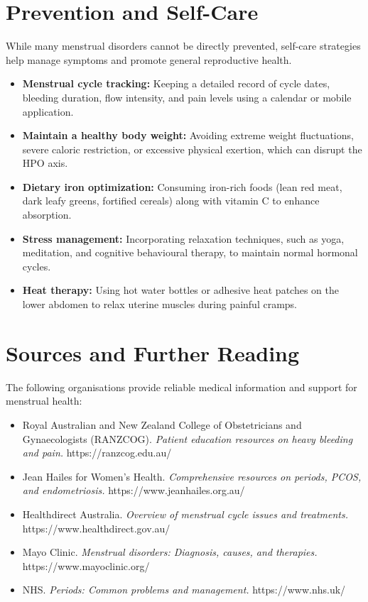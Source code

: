 \section*{Prevention and Self-Care}
While many menstrual disorders cannot be directly prevented, self-care strategies help manage symptoms and promote general reproductive health.
\begin{itemize}
    \item \textbf{Menstrual cycle tracking:} Keeping a detailed record of cycle dates, bleeding duration, flow intensity, and pain levels using a calendar or mobile application.
    \item \textbf{Maintain a healthy body weight:} Avoiding extreme weight fluctuations, severe caloric restriction, or excessive physical exertion, which can disrupt the HPO axis.
    \item \textbf{Dietary iron optimization:} Consuming iron-rich foods (lean red meat, dark leafy greens, fortified cereals) along with vitamin C to enhance absorption.
    \item \textbf{Stress management:} Incorporating relaxation techniques, such as yoga, meditation, and cognitive behavioural therapy, to maintain normal hormonal cycles.
    \item \textbf{Heat therapy:} Using hot water bottles or adhesive heat patches on the lower abdomen to relax uterine muscles during painful cramps.
\end{itemize}

\section*{Sources and Further Reading}
The following organisations provide reliable medical information and support for menstrual health:
\begin{itemize}
    \item Royal Australian and New Zealand College of Obstetricians and Gynaecologists (RANZCOG). \textit{Patient education resources on heavy bleeding and pain.} https://ranzcog.edu.au/
    \item Jean Hailes for Women's Health. \textit{Comprehensive resources on periods, PCOS, and endometriosis.} https://www.jeanhailes.org.au/
    \item Healthdirect Australia. \textit{Overview of menstrual cycle issues and treatments.} https://www.healthdirect.gov.au/
    \item Mayo Clinic. \textit{Menstrual disorders: Diagnosis, causes, and therapies.} https://www.mayoclinic.org/
    \item NHS. \textit{Periods: Common problems and management.} https://www.nhs.uk/
\end{itemize}
